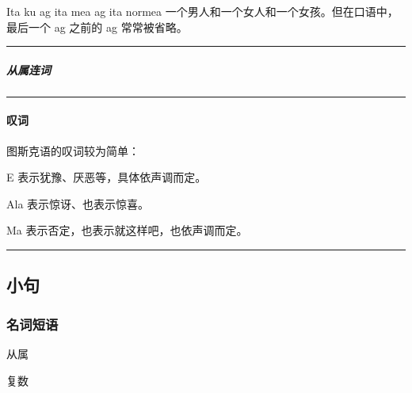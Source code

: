 \documentclass{article}
\begin{document}
Ita ku ag ita mea ag ita normea
一个男人和一个女人和一个女孩。但在口语中，最后一个 ag 之前的 ag
常常被省略。

\begin{center}\rule{0.5\linewidth}{0.5pt}\end{center}

\subparagraph{从属连词}\label{ux4eceux5c5eux8fdeux8bcd}

\begin{center}\rule{0.5\linewidth}{0.5pt}\end{center}

\paragraph{叹词}\label{ux53f9ux8bcd}

图斯克语的叹词较为简单：

E 表示犹豫、厌恶等，具体依声调而定。

Ala 表示惊讶、也表示惊喜。

Ma 表示否定，也表示就这样吧，也依声调而定。

\begin{center}\rule{0.5\linewidth}{0.5pt}\end{center}

\subsection{小句}\label{ux5c0fux53e5}

\subsubsection{名词短语}\label{ux540dux8bcdux77edux8bed}

从属

复数

\end{document}
